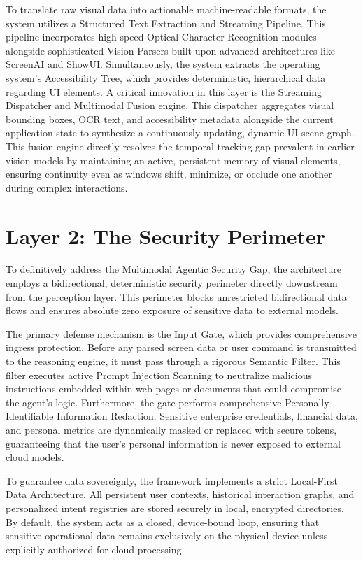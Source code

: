 \documentclass[12pt, a4paper]{report}
\begin{document}
To translate raw visual data into actionable machine-readable formats, the system utilizes a Structured Text Extraction and Streaming Pipeline. This pipeline incorporates high-speed Optical Character Recognition modules alongside sophisticated Vision Parsers built upon advanced architectures like ScreenAI and ShowUI.\cite{hojo2025} Simultaneously, the system extracts the operating system's Accessibility Tree, which provides deterministic, hierarchical data regarding UI elements. A critical innovation in this layer is the Streaming Dispatcher and Multimodal Fusion engine. This dispatcher aggregates visual bounding boxes, OCR text, and accessibility metadata alongside the current application state to synthesize a continuously updating, dynamic UI scene graph.\cite{hojo2025} This fusion engine directly resolves the temporal tracking gap prevalent in earlier vision models by maintaining an active, persistent memory of visual elements, ensuring continuity even as windows shift, minimize, or occlude one another during complex interactions.\cite{hojo2025}

\section{Layer 2: The Security Perimeter}
To definitively address the Multimodal Agentic Security Gap, the architecture employs a bidirectional, deterministic security perimeter directly downstream from the perception layer. This perimeter blocks unrestricted bidirectional data flows and ensures absolute zero exposure of sensitive data to external models.\cite{hojo2025}

The primary defense mechanism is the Input Gate, which provides comprehensive ingress protection. Before any parsed screen data or user command is transmitted to the reasoning engine, it must pass through a rigorous Semantic Filter.\cite{hojo2025} This filter executes active Prompt Injection Scanning to neutralize malicious instructions embedded within web pages or documents that could compromise the agent's logic.\cite{hojo2025} Furthermore, the gate performs comprehensive Personally Identifiable Information Redaction. Sensitive enterprise credentials, financial data, and personal metrics are dynamically masked or replaced with secure tokens, guaranteeing that the user's personal information is never exposed to external cloud models.\cite{hojo2025}

To guarantee data sovereignty, the framework implements a strict Local-First Data Architecture. All persistent user contexts, historical interaction graphs, and personalized intent registries are stored securely in local, encrypted directories.\cite{hojo2025} By default, the system acts as a closed, device-bound loop, ensuring that sensitive operational data remains exclusively on the physical device unless explicitly authorized for cloud processing.\cite{hojo2025}
\end{document}
